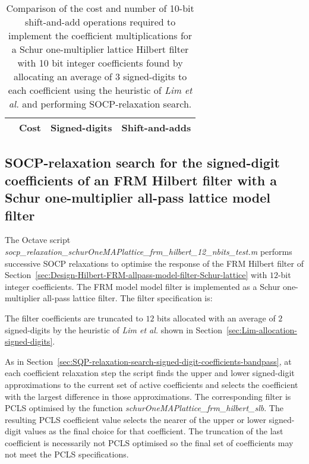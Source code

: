 \documentclass[a4paper,twoside,10pt,english]{report}
\begin{document}
\begin{table}[htb]
\centering
\begin{threeparttable}
\begin{tabular}{lccc}  \\ \toprule
& Cost&Signed-digits&Shift-and-adds\\ \midrule

\bottomrule
\end{tabular}
\end{threeparttable}
\caption[Summary of cost results for the Schur one-multiplier lattice 
Hilbert filter SOCP-relaxation example with 10 bit coefficients]
{Comparison of the cost and number of 10-bit shift-and-add operations required 
  to implement the coefficient multiplications for a Schur one-multiplier 
  lattice Hilbert filter with 10 bit integer coefficients found by allocating 
  an average of 3 signed-digits to each coefficient using the heuristic of 
  \emph{Lim et al.} and performing SOCP-relaxation search.}
\label{tab:socp-relax-hilbert-schurOneMlattice-10-nbits-cost-summary}
\end{table}
\clearpage
\subsection{\label{sec:SOCP-relaxation-search-signed-digit-coefficients-FRM-hilbert}SOCP-relaxation
  search for the signed-digit coefficients of an FRM Hilbert filter with a
  Schur one-multiplier all-pass lattice model filter}

The Octave script
\emph{socp\_relaxation\_schurOneMAPlattice\_frm\_hilbert\_12\_nbits\_test.m}
performs successive SOCP relaxations to optimise the response of the FRM
Hilbert filter of
Section~\ref{sec:Design-Hilbert-FRM-allpass-model-filter-Schur-lattice} with
$12$-bit integer coefficients. The FRM model model filter is implemented as a
Schur one-multiplier all-pass lattice filter. The filter specification is:
\begin{small}

\end{small} 
The filter coefficients are truncated to $12$ bits allocated with an average
of $2$ signed-digits by the heuristic of \emph{Lim et al.} shown in
Section~\ref{sec:Lim-allocation-signed-digits}. 

As in Section~\ref{sec:SQP-relaxation-search-signed-digit-coefficients-bandpass},
at each coefficient relaxation step the script finds the upper and lower
signed-digit approximations to the current set of active coefficients and
selects the coefficient with the largest difference in those approximations.
The corresponding filter is PCLS optimised by the function
\emph{schurOneMAPlattice\_frm\_hilbert\_slb}. The resulting PCLS coefficient
value selects the nearer of the upper or lower signed-digit values as the
final choice for that coefficient. The truncation of the last coefficient is
necessarily not PCLS optimised so the final set of coefficients may not meet
the PCLS specifications.
\end{document}
